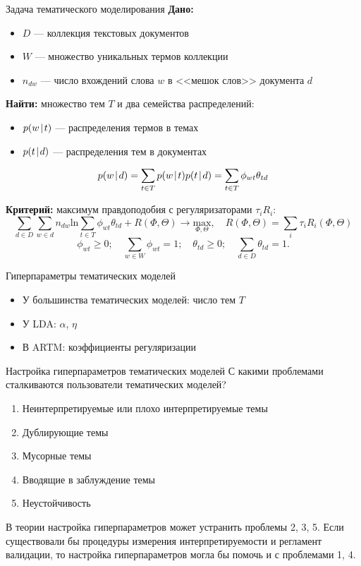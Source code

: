 \begin{frame}[t]{Задача тематического моделирования}
\textbf{Дано:}
\begin{itemize}
    \item $D$ --- коллекция текстовых документов
    \item $W$ --- множество уникальных термов коллекции
    \item $n_{dw}$ --- число вхождений слова $w$ в <<мешок слов>> документа $d$
\end{itemize}

\medskip
\textbf{Найти:}
множество тем $T$ и два семейства распределений:
\smallskip
\begin{itemize}
    \item $p(w \mspace{2mu}{|}\mspace{2mu} t)$ --- распределения термов в темах
    \item $p(t \mspace{2mu}{|}\mspace{2mu} d)$ --- распределения тем в документах
\end{itemize}

\[
p(w \mspace{2mu}{|}\mspace{2mu} d) = \sum_{t \in T} p(w \mspace{2mu}{|}\mspace{2mu} t)p(t \mspace{2mu}{|}\mspace{2mu} d) = \sum_{t \in T} \phi_{wt}\theta_{td}
\]

\smallskip
\textbf{Критерий:} максимум правдоподобия с регуляризаторами $\tau_i R_i$:
\[
    \sum_{d \in D} \sum_{w \in d} n_{dw} \mathrm{ln} \sum_{t \in T} \phi_{wt} \theta_{td} + R(\Phi, \Theta) \rightarrow \underset{\Phi, \Theta}{\mathrm{max}}, \quad R(\Phi, \Theta) = \sum_{i} \tau_i R_i(\Phi, \Theta)
\]
\[
\phi_{wt} \ge 0; \quad \sum_{w \in W} \phi_{wt} = 1; \quad \theta_{td} \ge 0; \quad \sum_{d \in D} \theta_{td} = 1.
\]
\bigskip

\end{frame}

\begin{frame}{Гиперпараметры тематических моделей}
\begin{itemize}
    \item У большинства тематических моделей: число тем $T$
    \item У LDA: $\alpha$, $\eta$
    \item В ARTM: коэффициенты регуляризации
\end{itemize}
\end{frame}


\begin{frame}[t]{Настройка гиперпараметров тематических моделей}
С какими проблемами сталкиваются пользователи тематических моделей?
\begin{enumerate}
    \item Неинтерпретируемые или плохо интерпретируемые темы
    \item Дублирующие темы
    \item Мусорные темы
    \item Вводящие в заблуждение темы
    \item Неустойчивость
\end{enumerate}
В теории настройка гиперпараметров может устранить проблемы 2, 3, 5. Если существовали бы процедуры измерения интерпретируемости и регламент валидации, то настройка гиперпараметров могла бы помочь и с проблемами 1, 4.
\end{frame}

